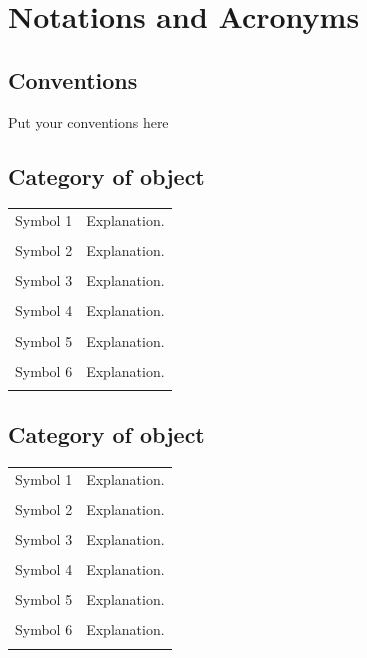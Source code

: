
\chapter*{Notations and Acronyms}
\section*{Conventions}
Put your conventions here

\vspace*{-0.2cm}
\section*{Category of object}
\begin{longtable}{>{\raggedright}p{6cm}p{12cm}}
    Symbol 1 & Explanation. \\ \\
    Symbol 2 & Explanation. \\ \\
    Symbol 3 & Explanation. \\ \\
    Symbol 4 & Explanation. \\ \\
    Symbol 5 & Explanation. \\ \\
    Symbol 6 & Explanation. \\ \\
\end{longtable}

\section*{Category of object}
\begin{longtable}{>{\raggedright}p{6cm}p{12cm}}
    Symbol 1 & Explanation. \\ \\
    Symbol 2 & Explanation. \\ \\
    Symbol 3 & Explanation. \\ \\
    Symbol 4 & Explanation. \\ \\
    Symbol 5 & Explanation. \\ \\
    Symbol 6 & Explanation. \\ \\
\end{longtable}

